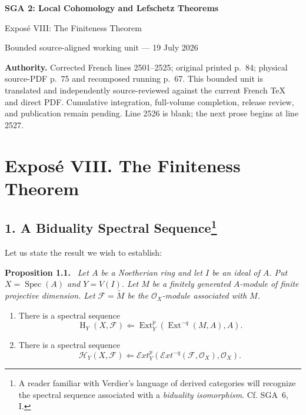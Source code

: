\documentclass[11pt,a4paper]{article}
\newcommand{\OX}{\mathcal O_X}
\newcommand{\Hloc}{\operatorname H}
\newcommand{\Ext}{\operatorname{Ext}}
\newcommand{\SheafExt}{\mathcal E\!xt}
\newcommand{\SheafH}{\mathcal H}
\newenvironment{sgastatement}[1]{\par\addvspace{0.75\baselineskip}\noindent\textbf{#1.}\ \itshape}{\par}
\begin{document}
\begin{center}
  {\Large\bfseries SGA 2: Local Cohomology and Lefschetz Theorems}\par\medskip
  {\large Expos\'e VIII: The Finiteness Theorem}\par\smallskip
  Bounded source-aligned working unit --- 19 July 2026
\end{center}
\noindent\colorbox{softgray}{\parbox{0.94\linewidth}{\small\textbf{Authority.}
Corrected French lines 2501--2525; original printed p.~84; physical source-PDF
p.~75 and recomposed running p.~67. This bounded unit is translated and
independently source-reviewed against the current French TeX and direct PDF.
Cumulative integration, full-volume completion, release review, and
publication remain pending. Line 2526 is blank; the next prose begins at line
2527.}}

\section*{Expos\'e VIII. The Finiteness Theorem}

\subsection*{1. A Biduality Spectral Sequence\footnote{A reader familiar with
Verdier's language of derived categories will recognize the spectral sequence
associated with a \emph{biduality isomorphism}. Cf. SGA~6, I.}}

Let us state the result we wish to establish:

\begin{sgastatement}{Proposition 1.1}
Let $A$ be a Noetherian ring and let $I$ be an ideal of $A$. Put
$X=\operatorname{Spec}(A)$ and $Y=V(I)$. Let $M$ be a finitely generated
$A$-module of finite projective dimension. Let
$\mathcal F=\widetilde M$ be the $\OX$-module associated with $M$.
\begin{enumerate}
\item[\textup{1)}] There is a spectral sequence
\[
  \Hloc_Y(X,\mathcal F)\Longleftarrow
  \Ext_Y^p(\Ext^{-q}(M,A),A).
\]
\item[\textup{2)}] There is a spectral sequence
\[
  \SheafH_Y(X,\mathcal F)\Longleftarrow
  \SheafExt_Y^p(\SheafExt^{-q}(\mathcal F,\OX),\OX).
\]
\end{enumerate}
\end{sgastatement}
\end{document}
